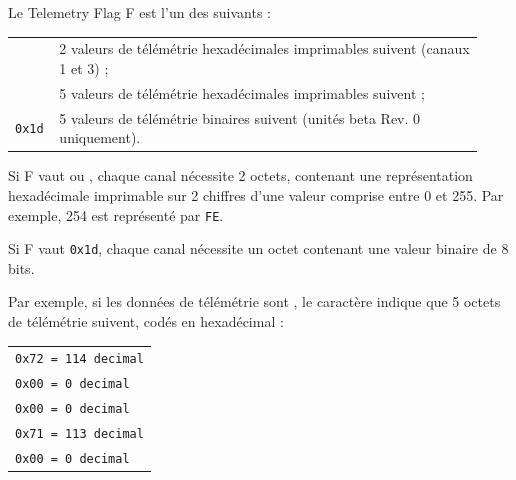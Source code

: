 \begin{aprsbodyblock}
Le Telemetry Flag F est l'un des suivants :

\begin{tabular}[t]{@{}>{\ttfamily}p{0.07\linewidth}p{0.86\linewidth}@{}}
\lit{`} & 2 valeurs de télémétrie hexadécimales imprimables suivent (canaux 1
et 3) ; \\
\lit{'} & 5 valeurs de télémétrie hexadécimales imprimables suivent ; \\
\texttt{0x1d} & 5 valeurs de télémétrie binaires suivent (unités beta Rev. 0
uniquement).
\end{tabular}

Si F vaut  ou , chaque canal nécessite 2 octets, contenant une
représentation hexadécimale imprimable sur 2 chiffres d'une valeur comprise
entre 0 et 255. Par exemple, 254 est représenté par \texttt{FE}.

Si F vaut \texttt{0x1d}, chaque canal nécessite un octet contenant une
valeur binaire de 8 bits.

Par exemple, si les données de télémétrie sont , le caractère
 indique que 5 octets de télémétrie suivent, codés en hexadécimal :

\begin{tabular}[t]{@{}l@{}}
\texttt{0x72 = 114 decimal}\\
\texttt{0x00 = 0 decimal}\\
\texttt{0x00 = 0 decimal}\\
\texttt{0x71 = 113 decimal}\\
\texttt{0x00 = 0 decimal}
\end{tabular}
\end{aprsbodyblock}

